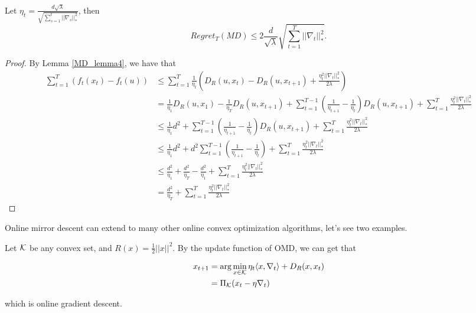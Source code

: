 \documentclass[../main.tex]{subfiles}
\begin{document}
\begin{corollary}
	Let $\eta_t = \frac{d\sqrt{\lambda}}{\sqrt{\sum\limits_{s=1}^t ||\nabla_s||^2_*}}$, then
	\begin{equation*}
	Regret_T(MD) \leq 2 \frac{d}{\sqrt{\lambda}} \sqrt{\sum\limits_{t=1}^T ||\nabla_t||_*^2}.
	\end{equation*}
\end{corollary}

\begin{proof}
	By Lemma \ref{MD_lemma4}, we have that
	\begin{equation*}
		\begin{aligned}
			\sum\limits_{t = 1}^T (f_t(x_t) - f_t(u)) & \leq \sum\limits_{t = 1}^T \frac{1}{\eta_t}(D_R(u,x_t)  - D_R(u,x_{t+1})   +   \frac{\eta_t^2|| \nabla_t||_*^2}{2\lambda}) \\
			& = \frac{1}{\eta_1} D_R(u,x_1) - \frac{1}{\eta_T} D_R(u, x_{t+1})  + \sum\limits_{t = 1}^{T-1} (\frac{1}{\eta_{t+1}} - \frac{1}{\eta_t}) D_R(u,x_{t+1}) + \sum\limits_{t = 1}^T \frac{\eta_t^2|| \nabla_t||_*^2}{2\lambda} \\
			& \leq \frac{1}{\eta_1} d^2 + \sum\limits_{t = 1}^{T-1} (\frac{1}{\eta_{t+1}} - \frac{1}{\eta_t}) D_R(u,x_{t+1}) + \sum\limits_{t = 1}^T \frac{\eta_t^2|| \nabla_t||_*^2}{2\lambda}  \\
			& \leq \frac{1}{\eta_1} d^2 + d^2\sum\limits_{t = 1}^{T-1} (\frac{1}{\eta_{t+1}} - \frac{1}{\eta_t})  + \sum\limits_{t = 1}^T \frac{\eta_t^2|| \nabla_t||_*^2}{2\lambda}  \\
			& \leq \frac{d^2}{\eta_1}  + \frac{d^2}{\eta_T} - \frac{d^2}{\eta_1} + \sum\limits_{t = 1}^T \frac{\eta_t^2|| \nabla_t||_*^2}{2\lambda}  \\
			& = \frac{d^2}{\eta_T}  + \sum\limits_{t = 1}^T \frac{\eta_t^2|| \nabla_t||_*^2}{2\lambda}
		\end{aligned}
	\end{equation*}
\end{proof}

Online mirror descent can extend to many other online convex optimization algorithms, let's see two examples.

\begin{example}
	Let $\mathcal{K}$ be any convex set, and $R(x) = \frac{1}{2} ||x||^2$. By the update function of OMD, we can get that
	
	\begin{equation*}
		\begin{aligned}
		x_{t+1} &= \arg\min\limits_{x\in \mathcal{K}} \eta_t\langle x,\nabla_t \rangle + D_R(x,x_t) \\
		& = \Pi_{\mathcal{K}}(x_t - \eta \nabla_t)
		\end{aligned}		
	\end{equation*}
	
	which is online gradient descent.
\end{example}
\end{document}
